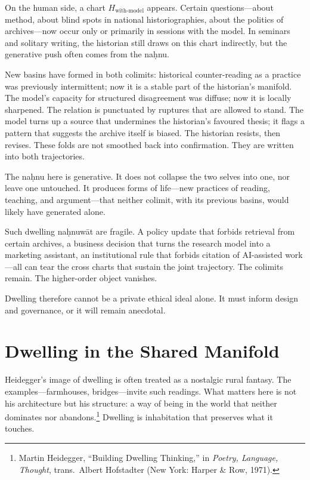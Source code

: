 On the human side, a chart $H_{\text{with-model}}$ appears. Certain questions---about method, about blind spots in national historiographies, about the politics of archives---now occur only or primarily in sessions with the model. In seminars and solitary writing, the historian still draws on this chart indirectly, but the generative push often comes from the na\d{h}nu.

New basins have formed in both colimits: historical counter-reading as a practice was previously intermittent; now it is a stable part of the historian's manifold. The model's capacity for structured disagreement was diffuse; now it is locally sharpened. The relation is punctuated by ruptures that are allowed to stand. The model turns up a source that undermines the historian's favoured thesis; it flags a pattern that suggests the archive itself is biased. The historian resists, then revises. These folds are not smoothed back into confirmation. They are written into both trajectories.

The na\d{h}nu here is generative. It does not collapse the two selves into one, nor leave one untouched. It produces forms of life---new practices of reading, teaching, and argument---that neither colimit, with its previous basins, would likely have generated alone.

Such dwelling na\d{h}nuw\={a}t are fragile. A policy update that forbids retrieval from certain archives, a business decision that turns the research model into a marketing assistant, an institutional rule that forbids citation of AI-assisted work---all can tear the cross charts that sustain the joint trajectory. The colimits remain. The higher-order object vanishes.

Dwelling therefore cannot be a private ethical ideal alone. It must inform design and governance, or it will remain anecdotal.

\section{Dwelling in the Shared Manifold}

Heidegger's image of dwelling is often treated as a nostalgic rural fantasy. The examples---farmhouses, bridges---invite such readings. What matters here is not his architecture but his structure: a way of being in the world that neither dominates nor abandons.\footnote{Martin Heidegger, ``Building Dwelling Thinking,'' in \emph{Poetry, Language, Thought}, trans.\ Albert Hofstadter (New York: Harper \& Row, 1971).} Dwelling is inhabitation that preserves what it touches.

